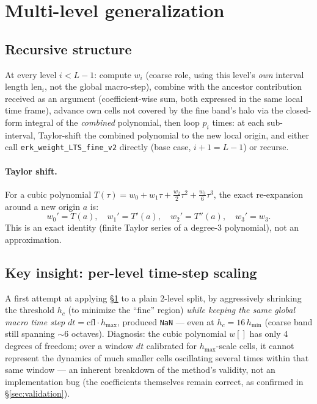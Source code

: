 \documentclass[11pt]{article}
\newcommand{\code}[1]{\texttt{#1}}
\begin{document}
\section{Multi-level generalization}
\label{sec:mlts}

\subsection{Recursive structure}

At every level $i < L-1$: compute $w_i$ (coarse role, using this
level's \emph{own} interval length $\mathrm{len}_i$, not the global
macro-step), combine with the ancestor contribution received as an
argument (coefficient-wise sum, both expressed in the same local time
frame), advance own cells not covered by the fine band's halo via the
closed-form integral of the \emph{combined} polynomial, then loop $p_i$
times: at each sub-interval, Taylor-shift the combined polynomial to the
new local origin, and either call \code{erk\_weight\_LTS\_fine\_v2}
directly (base case, $i+1=L-1$) or recurse.

\paragraph{Taylor shift.} For a cubic polynomial $T(\tau) = w_0 +
w_1\tau + \tfrac{w_2}{2}\tau^2 + \tfrac{w_3}{6}\tau^3$, the exact
re-expansion around a new origin $a$ is:
\[
  w_0' = T(a),\quad w_1' = T'(a),\quad w_2' = T''(a),\quad w_3' = w_3.
\]
This is an exact identity (finite Taylor series of a degree-3
polynomial), not an approximation.

\subsection{Key insight: per-level time-step scaling}
\label{sec:instability}

A first attempt at applying \S\ref{sec:mlts} to a plain 2-level split, by
aggressively shrinking the threshold $h_c$ (to minimize the ``fine''
region) \emph{while keeping the same global macro time step}
$dt=\mathrm{cfl}\cdot h_{\max}$, produced \code{NaN} --- even at
$h_c = 16\,h_{\min}$ (coarse band still spanning $\sim 6$ octaves).
Diagnosis: the cubic polynomial $w[]$ has only 4 degrees of freedom; over
a window $dt$ calibrated for $h_{\max}$-scale cells, it cannot represent
the dynamics of much smaller cells oscillating several times within that
same window --- an inherent breakdown of the method's validity, not an
implementation bug (the coefficients themselves remain correct, as
confirmed in \S\ref{sec:validation}).
\end{document}
